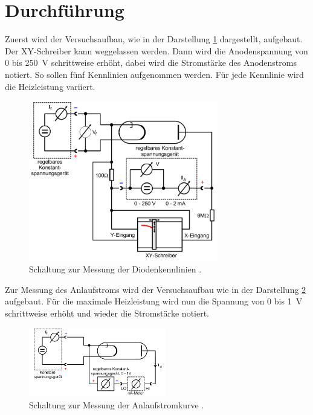 \section{Durchführung}
\label{sec:Durchführung}
Zuerst wird der Versuchsaufbau, wie in der Darstellung \ref{fig:SDL} dargestellt,
aufgebaut. Der XY-Schreiber kann weggelassen werden.
Dann wird die Anodenspannung von 0 bis \SI{250}{\volt} schrittweise
erhöht, dabei wird die Stromstärke des Anodenstroms notiert.
So sollen fünf Kennlinien aufgenommen werden. Für jede Kennlinie wird die
Heizleistung variiert. \\
\begin{figure}
  \centering
  \includegraphics[height=7cm]{logos/Schaltung-Diodenkennlinie.png}
  \caption{Schaltung zur Messung der Diodenkennlinien \cite{Anleitung}.}
  \label{fig:SDL}
\end{figure}
Zur Messung des Anlaufstroms wird der Versuchsaufbau wie in der Darstellung \ref{fig:SAK} aufgebaut.
Für die maximale Heizleistung wird nun die Spannung von 0 bis \SI{1}{\volt}
schrittweise erhöht und wieder die Stromstärke notiert.

\begin{figure}
  \centering
  \includegraphics[height=3cm]{logos/Schaltung-Anlaufstromkurve.png}
  \caption{Schaltung zur Messung der Anlaufstromkurve \cite{Anleitung}.}
  \label{fig:SAK}
\end{figure}
